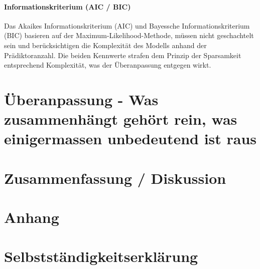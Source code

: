 \documentclass[english,12pt,doc]{apa}
\begin{document}
\paragraph{Informationskriterium (AIC / BIC)} Das Akaikes Informationskriterium (AIC) und Bayessche Informationskriterium (BIC) basieren auf der Maximum-Likelihood-Methode, müssen nicht geschachtelt sein und berücksichtigen die Komplexität des Modells anhand der Prädiktoranzahl. 
Die beiden Kennwerte strafen dem Prinzip der Sparsamkeit entsprechend Komplexität, was der Überanpassung entgegen wirkt.

\section{Überanpassung - Was zusammenhängt gehört rein, was einigermassen unbedeutend ist raus}\label{sparsamkeit}
\section{Zusammenfassung / Diskussion}


\blindtext

\newpage
 

\newpage
\section{Anhang}
\blindtext
\newpage
\section{Selbstständigkeitserklärung}
\blindtext

\end{document}
